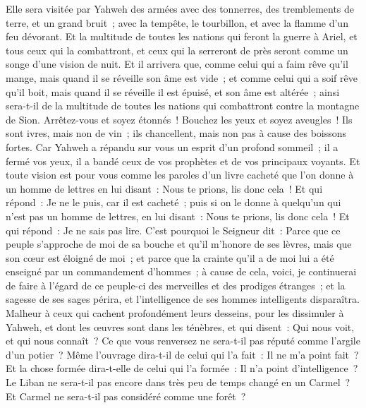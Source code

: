 \begin{multicols}{2}
Elle sera visitée par Yahweh des armées avec des tonnerres, des tremblements de terre, et un grand bruit~; avec la tempête, le tourbillon, et avec la flamme d'un feu dévorant.
Et la multitude de toutes les nations qui feront la guerre à Ariel, et tous ceux qui la combattront, et ceux qui la serreront de près seront comme un songe d'une vision de nuit.
Et il arrivera que, comme celui qui a faim rêve qu'il mange, mais quand il se réveille son âme est vide~; et comme celui qui a soif rêve qu'il boit, mais quand il se réveille il est épuisé, et son âme est altérée~; ainsi sera-t-il de la multitude de toutes les nations qui combattront contre la montagne de Sion.
Arrêtez-vous et soyez étonnés~! Bouchez les yeux et soyez aveugles~! Ils sont ivres, mais non de vin~; ils chancellent, mais non pas à cause des boissons fortes.
Car Yahweh a répandu sur vous un esprit d'un profond sommeil~; il a fermé vos yeux, il a bandé ceux de vos prophètes et de vos principaux voyants.
Et toute vision est pour vous comme les paroles d'un livre cacheté que l'on donne à un homme de lettres en lui disant~: Nous te prions, lis donc cela~! Et qui répond~: Je ne le puis, car il est cacheté~;
puis si on le donne à quelqu'un qui n'est pas un homme de lettres, en lui disant~: Nous te prions, lis donc cela~! Et qui répond~: Je ne sais pas lire.
C'est pourquoi le Seigneur dit~: Parce que ce peuple s'approche de moi de sa bouche et qu'il m'honore de ses lèvres, mais que son cœur est éloigné de moi~; et parce que la crainte qu'il a de moi lui a été enseigné par un commandement d'hommes~;
à cause de cela, voici, je continuerai de faire à l'égard de ce peuple-ci des merveilles et des prodiges étranges~; et la sagesse de ses sages périra, et l'intelligence de ses hommes intelligents disparaîtra.
Malheur à ceux qui cachent profondément leurs desseins, pour les dissimuler à Yahweh, et dont les œuvres sont dans les ténèbres, et qui disent~: Qui nous voit, et qui nous connaît~?
Ce que vous renversez ne sera-t-il pas réputé comme l'argile d'un potier~? Même l'ouvrage dira-t-il de celui qui l'a fait~: Il ne m'a point fait~? Et la chose formée dira-t-elle de celui qui l'a formée~: Il n'a point d'intelligence~?
Le Liban ne sera-t-il pas encore dans très peu de temps changé en un Carmel~? Et Carmel ne sera-t-il pas considéré comme une forêt~?

\end{multicols}
